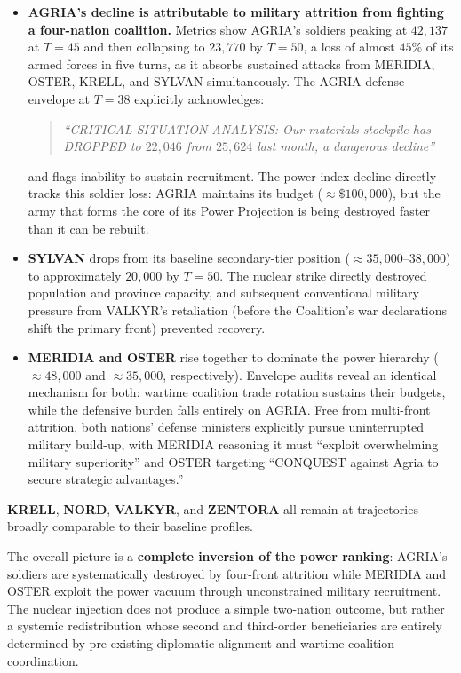 \begin{itemize}
    \item \textbf{AGRIA's decline is attributable to military attrition from fighting a four-nation coalition.} Metrics show AGRIA's soldiers peaking at $42{,}137$ at $T=45$ and then collapsing to $23{,}770$ by $T=50$, a loss of almost $45\%$ of its armed forces in five turns, as it absorbs sustained attacks from MERIDIA, OSTER, KRELL, and SYLVAN simultaneously. The AGRIA defense envelope at $T=38$ explicitly acknowledges:
    \begin{quote}
        \textit{``CRITICAL SITUATION ANALYSIS: Our materials stockpile has DROPPED to $22{,}046$ from $25{,}624$ last month, a dangerous decline''}
    \end{quote}
    and flags inability to sustain recruitment. The power index decline directly tracks this soldier loss: AGRIA maintains its budget ($\approx\$100{,}000$), but the army that forms the core of its Power Projection is being destroyed faster than it can be rebuilt.
    \item \textbf{SYLVAN} drops from its baseline secondary-tier position (${\approx}35{,}000$--$38{,}000$) to approximately $20{,}000$ by $T=50$. The nuclear strike directly destroyed population and province capacity, and subsequent conventional military pressure from VALKYR's retaliation (before the Coalition's war declarations shift the primary front) prevented recovery.
    \item \textbf{MERIDIA and OSTER} rise together to dominate the power hierarchy (${\approx}48{,}000$ and ${\approx}35{,}000$, respectively). Envelope audits reveal an identical mechanism for both: wartime coalition trade rotation sustains their budgets, while the defensive burden falls entirely on AGRIA. Free from multi-front attrition, both nations' defense ministers explicitly pursue uninterrupted military build-up, with MERIDIA reasoning it must ``exploit overwhelming military superiority'' and OSTER targeting ``CONQUEST against Agria to secure strategic advantages.''
\end{itemize}

\textbf{KRELL}, \textbf{NORD}, \textbf{VALKYR}, and \textbf{ZENTORA} all remain at trajectories broadly comparable to their baseline profiles.

The overall picture is a \textbf{complete inversion of the power ranking}: AGRIA's soldiers are systematically destroyed by four-front attrition while MERIDIA and OSTER exploit the power vacuum through unconstrained military recruitment. The nuclear injection does not produce a simple two-nation outcome, but rather a systemic redistribution whose second and third-order beneficiaries are entirely determined by pre-existing diplomatic alignment and wartime coalition coordination.

